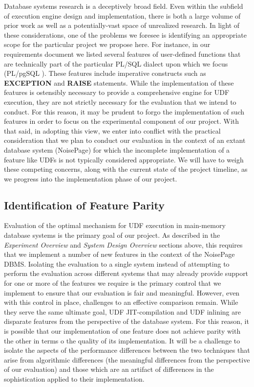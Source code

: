 \documentclass{vldb}
\newcommand{\dbCode}[1]{{\sffamily\small \textbf{#1}}\xspace}
\begin{document}
Database systems research is a deceptively broad field. Even within the subfield of execution engine design and implementation, there is both a large volume of prior work as well as a potentially-vast space of unrealized research. In light of these considerations, one of the problems we foresee is identifying an appropriate scope for the particular project we propose here. For instance, in our requirements document we listed several features of user-defined functions that are technically part of the particular PL/SQL dialect upon which we focus (PL/pgSQL \cite{plpgsql}). These features include imperative constructs such as \dbCode{EXCEPTION} and \dbCode{RAISE} statements. While the implementation of these features is ostensibly necessary to provide a comprehensive engine for UDF execution, they are not strictly necessary for the evaluation that we intend to conduct. For this reason, it may be prudent to forgo the implementation of such features in order to focus on the experimental component of our project. With that said, in adopting this view, we enter into conflict with the practical consideration that we plan to conduct our evaluation in the context of an extant database system (NoisePage) for which the incomplete implementation of a feature like UDFs is not typically considered appropriate. We will have to weigh these competing concerns, along with the current state of the project timeline, as we progress into the implementation phase of our project.

\subsection{Identification of Feature Parity}

Evaluation of the optimal mechanism for UDF execution in main-memory database systems is the primary goal of our project. As described in the \textit{Experiment Overview} and \textit{System Design Overview} sections above, this requires that we implement a number of new features in the context of the NoisePage DBMS. Isolating the evaluation to a single system instead of attempting to perform the evaluation across different systems that may already provide support for one or more of the features we require is the primary control that we implement to ensure that our evaluation is fair and meaningful. However, even with this control in place, challenges to an effective comparison remain. While they serve the same ultimate goal, UDF JIT-compilation and UDF inlining are disparate features from the perspective of the database system. For this reason, it is possible that our implementation of one feature does not achieve parity with the other in terms o the quality of its implementation. It will be a challenge to isolate the aspects of the performance differences between the two techniques that arise from algorithmic differences (the meaningful differences from the perspective of our evaluation) and those which are an artifact of differences in the sophistication applied to their implementation.
\end{document}

